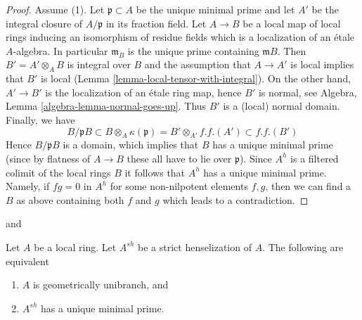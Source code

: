 \begin{proof}
\medskip\noindent
Assume (1). Let $\mathfrak p \subset A$ be the unique minimal
prime and let $A'$ be the integral closure of $A/\mathfrak p$
in its fraction field. Let $A \to B$ be a local map of local rings
inducing an isomorphism of residue fields which is a
localization of an \'etale $A$-algebra. In particular $\mathfrak m_B$
is the unique prime containing $\mathfrak m B$. Then $B' = A' \otimes_A B$
is integral over $B$ and the assumption that $A \to A'$ is local
implies that $B'$ is local (Lemma \ref{lemma-local-tensor-with-integral}).
On the other hand, $A' \to B'$ is the localization
of an \'etale ring map, hence $B'$ is normal, see
Algebra, Lemma \ref{algebra-lemma-normal-goes-up}.
Thus $B'$ is a (local) normal domain. Finally, we have
$$
B/\mathfrak pB \subset B \otimes_A \kappa(\mathfrak p)
= B' \otimes_{A'} f.f.(A') \subset f.f.(B')
$$
Hence $B/\mathfrak pB$ is a domain, which implies that $B$ has a unique
minimal prime (since by flatness of $A \to B$ these all have to lie
over $\mathfrak p$). Since $A^h$ is a filtered colimit of
the local rings $B$ it follows that $A^h$ has a unique minimal prime.
Namely, if $fg = 0$ in $A^h$ for some non-nilpotent elements
$f, g$, then we can find a $B$ as above containing both $f$ and $g$
which leads to a contradiction.
\end{proof}

\begin{lemma}
\label{lemma-geometrically-unibranch}
\begin{reference}
\cite[Lemma 2.2]{Etale-coverings} and
\cite[Chapter IV Proposition 18.8.15]{EGA4}
\end{reference}
Let $A$ be a local ring. Let $A^{sh}$ be a strict henselization of $A$.
The following are equivalent
\begin{enumerate}
\item $A$ is geometrically unibranch, and
\item $A^{sh}$ has a unique minimal prime.
\end{enumerate}
\end{lemma}

